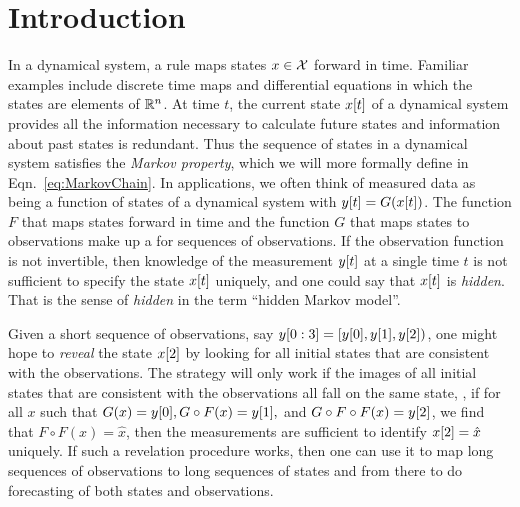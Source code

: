 

\chapter{Introduction}
\label{chap:introduction}

In a dynamical system, a rule maps states $x\in\cal X$ forward in
time.  Familiar examples include discrete time maps
and differential equations
in which the states are elements of $\mathbb{R}^n$.  At time $t$, the
current state ${x}{[t]}$ of a dynamical system provides all the
information necessary to calculate future states and information about
past states is redundant.  Thus the sequence of states in a dynamical
system satisfies the \emph{Markov property}, which we will more
formally define in Eqn.~\eqref{eq:MarkovChain}.  In applications, we
often think of measured data as being a function of states of a
dynamical system with $ {y}{[t]} = G({x}{[t]})$.  The function $F$
that maps states forward in time and the function $G$ that maps states
to observations make up a \emph{} for
sequences of observations.  If the observation function is not
invertible, then knowledge of the measurement ${y}{[t]}$ at a single
time $t$ is not sufficient to specify the state ${x}{[t]}$ uniquely,
and one could say that ${x}{[t]}$ is \emph{hidden}.  That is the
sense of \emph{hidden} in the term ``hidden Markov model''.

Given a short sequence of observations, say
$y[0:3] = \left[ {y}{[0]},{y}{[1]}, {y}{[2]}\right)$, one
might hope to \emph{reveal} the state ${x}{[2]}$ by looking for all
initial states that are consistent with the observations.  The
strategy will only work if the images of all initial states that are
consistent with the observations all fall on the same state, \ie, if
for all $x$ such that $ G(x) = {y}{[0]}, G\circ F(x) = {y}{[1]},$
and $G\circ F\circ F(x) = {y}{[2]}$, we find that
$F\circ F(x) = \hat x$, then the measurements are sufficient to
identify ${x}{[2]} = \hat x$ uniquely.  If such a revelation
procedure works, then one can use it to map long sequences of
observations to long sequences of states and from there to do
forecasting of both states and observations.

